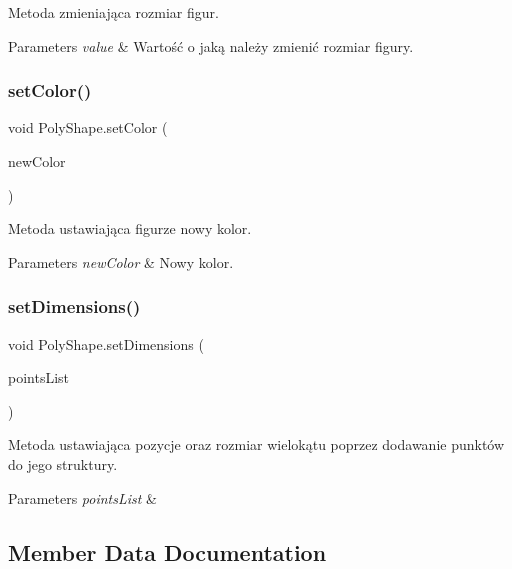 Metoda zmieniająca rozmiar figur. 
\begin{DoxyParams}{Parameters}
{\em value} & Wartość o jaką należy zmienić rozmiar figury. \\
\hline
\end{DoxyParams}
\mbox{\label{class_poly_shape_a040120940c2e88f61aa83b475143a5db}} 
\subsubsection{set\+Color()}
{\footnotesize\ttfamily void Poly\+Shape.\+set\+Color (\begin{DoxyParamCaption}\item[{Color}]{new\+Color }\end{DoxyParamCaption})}

Metoda ustawiająca figurze nowy kolor. 
\begin{DoxyParams}{Parameters}
{\em new\+Color} & Nowy kolor. \\
\hline
\end{DoxyParams}
\mbox{\label{class_poly_shape_ad726002d0715c48fb3170d217c2776b8}} 
\subsubsection{set\+Dimensions()}
{\footnotesize\ttfamily void Poly\+Shape.\+set\+Dimensions (\begin{DoxyParamCaption}\item[{Array\+List$<$ Point $>$}]{points\+List }\end{DoxyParamCaption})}

Metoda ustawiająca pozycje oraz rozmiar wielokątu poprzez dodawanie punktów do jego struktury. 
\begin{DoxyParams}{Parameters}
{\em points\+List} & \\
\hline
\end{DoxyParams}


\subsection{Member Data Documentation}
\mbox{\label{class_poly_shape_a651a20eeb881b58cd9f55aa63e9a859c}} 
